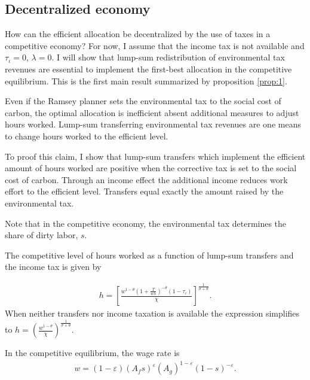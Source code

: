\subsection{Decentralized economy}
How can the efficient allocation be decentralized by the use of taxes in a competitive economy? For now, I assume that the income tax is not available and $\tau_{\iota}=0$, $\lambda=0$.
I will show that lump-sum redistribution of environmental tax revenues are essential to implement the first-best allocation in the competitive equilibrium. This is the first main result summarized by proposition \ref{prop:1}. 

\begin{prop}\label{prop:1}
Even if the Ramsey planner sets the environmental tax to the social cost of carbon, %
the optimal allocation is inefficient absent additional measures to adjust hours worked. Lump-sum transferring environmental tax revenues are one means to change hours worked to the efficient level. 
\end{prop}


To proof this claim, I show that lump-sum transfers which implement the efficient amount of hours worked are positive when the corrective tax is set to the social cost of carbon. Through an income effect the additional income reduces work effort to the efficient level. Transfers equal exactly the amount raised by the environmental tax. 

Note that in the competitive economy, the environmental tax determines the share of dirty labor, $s$. 

The competitive level of hours worked as a function of lump-sum transfers and the income tax is given by

\begin{align}
h = \left[\frac{w^{1-\theta}\left(1+\frac{T}{wh}\right)^{-\theta}(1-\tau_{\iota})}{\chi}\right]^{\frac{1}{\sigma+\theta}}.\label{eq:hopt}
\end{align}
When neither transfers nor income taxation is available the expression simplifies to $h=\left(\frac{w^{1-\theta}}{\chi}\right)^\frac{1}{\sigma +\theta}$.


In the competitive equilibrium, the wage rate is
\begin{align}
w= (1-\varepsilon)(A_fs)^\varepsilon (A_g)^{1-\varepsilon}(1-s)^{-\varepsilon}. \label{eq:compw}
\end{align}


